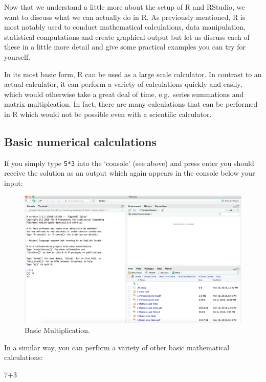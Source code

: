 \documentclass[
]{book}
\newenvironment{Shaded}{\begin{snugshade}}{\end{snugshade}}
\newcommand{\DecValTok}[1]{\textcolor[rgb]{0.00,0.00,0.81}{#1}}
\newcommand{\SpecialCharTok}[1]{\textcolor[rgb]{0.00,0.00,0.00}{#1}}
\theoremstyle{definition}
\theoremstyle{definition}
\theoremstyle{definition}
\theoremstyle{definition}
\theoremstyle{remark}
\begin{document}
Now that we understand a little more about the setup of R and RStudio, we want to discuss what we can actually do in R. As previously mentioned, R is most notably used to conduct mathematical calculations, data manipulation, statistical computations and create graphical output but let us discuss each of these in a little more detail and give some practical examples you can try for yourself.

In its most basic form, R can be used as a large scale calculator. In contrast to an actual calculator, it can perform a variety of calculations quickly and easily, which would otherwise take a great deal of time, e.g.~series summations and matrix multiplcation. In fact, there are many calculations that can be performed in R which would not be possible even with a scientific calculator.

\hypertarget{basic-numerical-calculations}{%
\subsection{Basic numerical calculations}\label{basic-numerical-calculations}}

If you simply type \texttt{5*3} into the `console' (see above) and press enter you should receive the solution as an output which again appears in the console below your input:

\begin{figure}

{\centering \includegraphics[width=0.7\linewidth]{Figures/Ex1} 

}

\caption{Basic Multiplication.}\label{fig:Multiplication}
\end{figure}

In a similar way, you can perform a variety of other basic mathematical calculations:

\begin{Shaded}
\begin{Highlighting}[]
\DecValTok{7}\SpecialCharTok{+}\DecValTok{3}
\end{Highlighting}
\end{Shaded}
\end{document}
